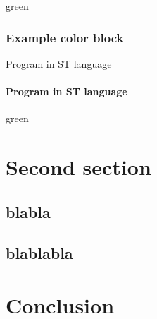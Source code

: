       \begin{colorbox}{}{green}
        
      \end{colorbox}

      \newpage
      \subsubsection{Example color block}

        \noindent \begin{exemple}{Program in ST language}
          
        \end{exemple}

        \paragraph*{Program in ST language}
        \noindent \begin{exemple*}
          
        \end{exemple*}

        \begin{colorbox}{}{green}
          
        \end{colorbox}

  \section{Second section}

    \subsection{blabla}
    \subsection{blablabla}

  \section{Conclusion}

